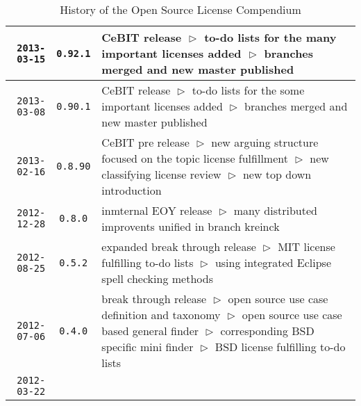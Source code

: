 \begin{table}
\footnotesize
\caption{History of the Open Source License Compendium}
\begin{center}
\begin{tabular}{|r|c|p{10cm}|}
\hline
\hline
    \texttt{2013-03-15}
  & \texttt{0.92.1} 
  & CeBIT release\newline
    $\vartriangleright$ to-do lists for the many important licenses added\newline
    $\vartriangleright$ branches merged and new master published\\
\hline
    \texttt{2013-03-08}
  & \texttt{0.90.1} 
  & CeBIT release\newline
    $\vartriangleright$ to-do lists for the some important licenses added\newline
    $\vartriangleright$ branches merged and new master published\\
\hline
    \texttt{2013-02-16}
  & \texttt{0.8.90} 
  & CeBIT pre release\newline
    $\vartriangleright$ new arguing structure focused on the topic license fulfillment\newline
    $\vartriangleright$ new classifying license review\newline   
    $\vartriangleright$ new top down introduction\\
\hline
    \texttt{2012-12-28}
  & \texttt{0.8.0} 
  & inmternal EOY release\newline
    $\vartriangleright$ many distributed improvents unified in branch kreinck\\
\hline
    \texttt{2012-08-25}
  & \texttt{0.5.2} 
  & expanded break through release\newline
    $\vartriangleright$ MIT license fulfilling to-do lists\newline
    $\vartriangleright$ using integrated Eclipse spell checking methods\\
\hline
    \texttt{2012-07-06}
  & \texttt{0.4.0} 
  & break through release\newline
    $\vartriangleright$ open source use case definition and taxonomy\newline 
    $\vartriangleright$ open source use case based general finder\newline 
    $\vartriangleright$ corresponding BSD specific mini finder\newline 
    $\vartriangleright$ BSD license fulfilling to-do lists\\
\hline
    \texttt{2012-03-22}

\end{tabular}
\end{center}
\end{table}
